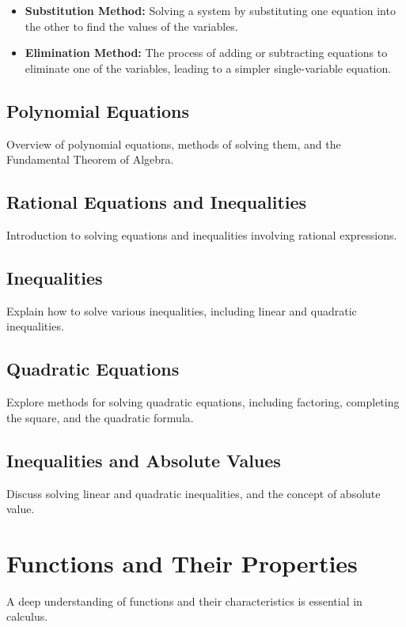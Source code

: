 \documentclass[a4paper,12pt]{book}
\begin{document}
\begin{itemize}
    \item \textbf{Substitution Method:} Solving a system by substituting one equation into the other to find the values of the variables.
    \item \textbf{Elimination Method:} The process of adding or subtracting equations to eliminate one of the variables, leading to a simpler single-variable equation.
\end{itemize}


\subsection{Polynomial Equations}
\label{subsec:polynomial_equations}
Overview of polynomial equations, methods of solving them, and the Fundamental Theorem of Algebra.


\subsection{Rational Equations and Inequalities}
\label{subsec:rational_equations_inequalities}
Introduction to solving equations and inequalities involving rational expressions.


\subsection{Inequalities}
\label{subsec:inequalities}
Explain how to solve various inequalities, including linear and quadratic inequalities.


\subsection{Quadratic Equations}
\label{subsec:quadratic_equations}
Explore methods for solving quadratic equations, including factoring, completing the square, and the quadratic formula.


\subsection{Inequalities and Absolute Values}
\label{subsec:inequalities_absolute_values}
Discuss solving linear and quadratic inequalities, and the concept of absolute value.


\section{Functions and Their Properties}
\label{sec:functions_and_properties}
A deep understanding of functions and their characteristics is essential in calculus.
\end{document}
